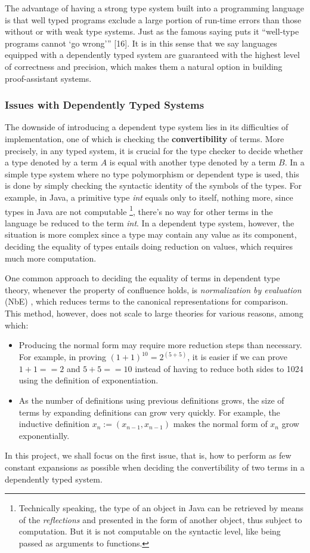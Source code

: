 \documentclass{article}
\theoremstyle{remark}
\begin{document}
The advantage of having a strong type system built into a programming language is that well typed programs exclude a large portion of run-time errors than those without or with weak type systems. Just as the famous saying puts it “well-type programs cannot ‘go wrong’” [16]. It is in this sense that we say languages equipped with a dependently typed system are guaranteed with the highest level of correctness and precision, which makes them a natural option in building proof-assistant systems.

\subsubsection{Issues with Dependently Typed Systems}
The downside of introducing a dependent type system lies in its difficulties of implementation, one of which is checking the \textbf{convertibility} of terms. More precisely, in any typed system, it is crucial for the type checker to decide whether a type denoted by a term $A$ is equal with another type denoted by a term $B$. In a simple type system where no type polymorphism or dependent type is used, this is done by simply checking the syntactic identity of the symbols of the types. For example, in Java, a primitive type \emph{int} equals only to itself, nothing more, since types in Java are not computable \footnote{Technically speaking, the type of an object in Java can be retrieved by means of the \emph{reflections} and presented in the form of another object, thus subject to computation. But it is not computable on the syntactic level, like being passed as arguments to functions.}, there's no way for other terms in the language be reduced to the term \emph{int}. In a dependent type system, however, the situation is more complex since a type may contain any value as its component, deciding the equality of types entails doing reduction on values, which requires much more computation.

One common approach to deciding the equality of terms in dependent type theory, whenever the property of confluence holds, is \textit{normalization by evaluation} (NbE) \cite{berger1998normalization}, which reduces terms to the canonical representations for comparison. This method, however, does not scale to large theories for various reasons, among which:
\begin{itemize}
\item Producing the normal form may require more reduction steps than necessary. For example, in proving $(1 + 1) ^ {10} = 2 ^{(5 + 5)}$, it is easier if we can prove $1 + 1 == 2$ and $5 + 5 == 10$ instead of having to reduce both sides to 1024 using the definition of exponentiation.
\item As the number of definitions using previous definitions grows, the size of terms by expanding definitions can grow very quickly. For example, the inductive definition $x_n := (x_{n-1}, x_{n-1})$ makes the normal form of $x_{n}$ grow exponentially.
\end{itemize}
In this project, we shall focus on the first issue, that is, how to perform as few constant expansions as possible when deciding the convertibility of two terms in a dependently typed system. 
\end{document}
